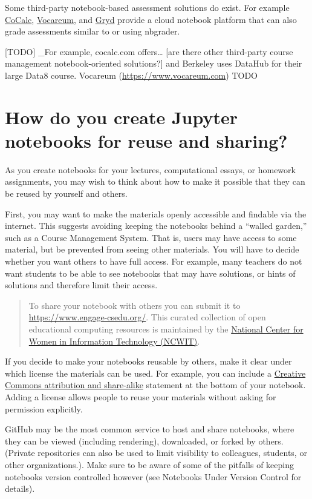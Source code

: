 \documentclass[]{book}
\begin{document}
Some third-party notebook-based assessment solutions do exist. For
example \href{www.cocalc.com}{CoCalc},
\href{www.vocareum.com}{Vocareum}, and \href{https://gryd.us}{Gryd}
provide a cloud notebook platform that can also grade assessments
similar to or using nbgrader.

{[}TODO{]} \_For example, cocalc.com offers\ldots{} {[}are there other
third-party course management notebook-oriented solutions?{]} and
Berkeley uses DataHub for their large Data8 course. Vocareum
(\url{https://www.vocareum.com}) TODO

\section{How do you create Jupyter notebooks for reuse and
sharing?}\label{how-do-you-create-jupyter-notebooks-for-reuse-and-sharing}

As you create notebooks for your lectures, computational essays, or
homework assignments, you may wish to think about how to make it
possible that they can be reused by yourself and others.

First, you may want to make the materials openly accessible and findable
via the internet. This suggests avoiding keeping the notebooks behind a
``walled garden,'' such as a Course Management System. That is, users
may have access to some material, but be prevented from seeing other
materials. You will have to decide whether you want others to have full
access. For example, many teachers do not want students to be able to
see notebooks that may have solutions, or hints of solutions and
therefore limit their access.

\begin{quote}
To share your notebook with others you can submit it to
\url{https://www.engage-csedu.org/}. This curated collection of open
educational computing resources is maintained by the
\href{https://www.ncwit.org/}{National Center for Women in Information
Technology (NCWIT)}.
\end{quote}

If you decide to make your notebooks reusable by others, make it clear
under which license the materials can be used. For example, you can
include a
\href{https://creativecommons.org/licenses/by-sa/3.0/us/}{Creative
Commons attribution and share-alike} statement at the bottom of your
notebook. Adding a license allows people to reuse your materials without
asking for permission explicitly.

GitHub may be the most common service to host and share notebooks, where
they can be viewed (including rendering), downloaded, or forked by
others. (Private repositories can also be used to limit visibility to
colleagues, students, or other organizations.). Make sure to be aware of
some of the pitfalls of keeping notebooks version controlled however
(see Notebooks Under Version Control for details).
\end{document}
